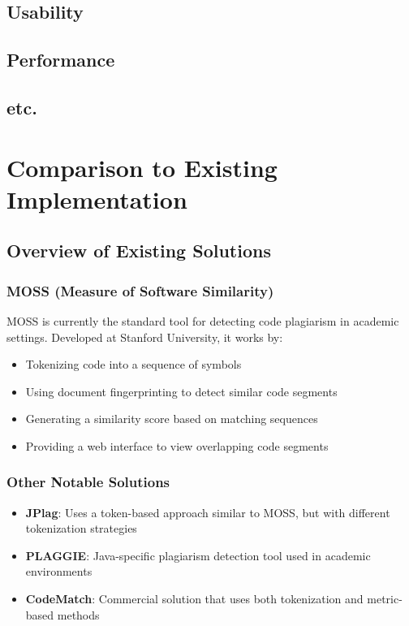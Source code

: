 \documentclass[12pt, titlepage]{article}
\begin{document}
\subsection{Usability}
		
\subsection{Performance}

\subsection{etc.}
	
\section{Comparison to Existing Implementation}	

\subsection{Overview of Existing Solutions}

\subsubsection{MOSS (Measure of Software Similarity)}
MOSS is currently the standard tool for detecting code plagiarism in academic settings. Developed at Stanford University, it works by:
\begin{itemize}
    \item Tokenizing code into a sequence of symbols
    \item Using document fingerprinting to detect similar code segments
    \item Generating a similarity score based on matching sequences
    \item Providing a web interface to view overlapping code segments
\end{itemize}

\subsubsection{Other Notable Solutions}
\begin{itemize}
    \item \textbf{JPlag}: Uses a token-based approach similar to MOSS, but with different tokenization strategies
    \item \textbf{PLAGGIE}: Java-specific plagiarism detection tool used in academic environments
    \item \textbf{CodeMatch}: Commercial solution that uses both tokenization and metric-based methods
\end{itemize}
\end{document}
